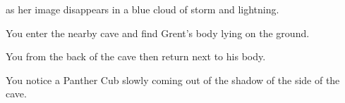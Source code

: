 
as her image disappears in a blue cloud of storm and lightning.




You enter the nearby cave and find Grent's body lying on the ground.



You  from the back of the cave then return next to his body.


You notice a Panther Cub slowly coming out of the shadow of the side of the cave.



\alliance{}


\horde{}

